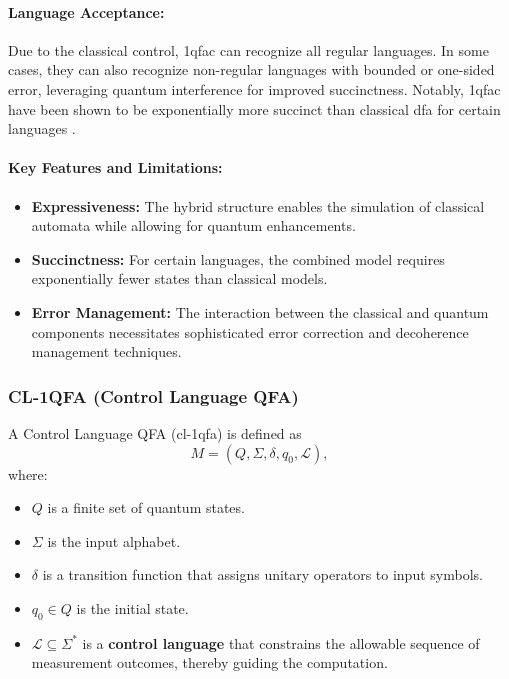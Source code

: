 \paragraph{Language Acceptance:}  
Due to the classical control, \gls{1qfac} can recognize all regular languages. In some cases, they can also recognize non-regular languages with bounded or one-sided error, leveraging quantum interference for improved succinctness. Notably, \gls{1qfac} have been shown to be exponentially more succinct than classical \gls{dfa} for certain languages \cite{bianchi2014size}.

\paragraph{Key Features and Limitations:}
\begin{itemize}
    \item \textbf{Expressiveness:} The hybrid structure enables the simulation of classical automata while allowing for quantum enhancements.
    \item \textbf{Succinctness:} For certain languages, the combined model requires exponentially fewer states than classical models.
    \item \textbf{Error Management:} The interaction between the classical and quantum components necessitates sophisticated error correction and decoherence management techniques.
\end{itemize}

\subsubsection{CL-1QFA (Control Language QFA)}
\label{sssec:cl-1qfa}
\begin{definition}[CL-1QFA]
A Control Language QFA (\gls{cl-1qfa}) is defined as 
\[
M = (Q, \Sigma, \delta, q_0, \mathcal{L}),
\]
where:
\begin{itemize}
    \item \( Q \) is a finite set of quantum states.
    \item \( \Sigma \) is the input alphabet.
    \item \(\delta\) is a transition function that assigns unitary operators to input symbols.
    \item \( q_0 \in Q \) is the initial state.
    \item \( \mathcal{L} \subseteq \Sigma^* \) is a \textbf{control language} that constrains the allowable sequence of measurement outcomes, thereby guiding the computation.
\end{itemize}
\end{definition}

